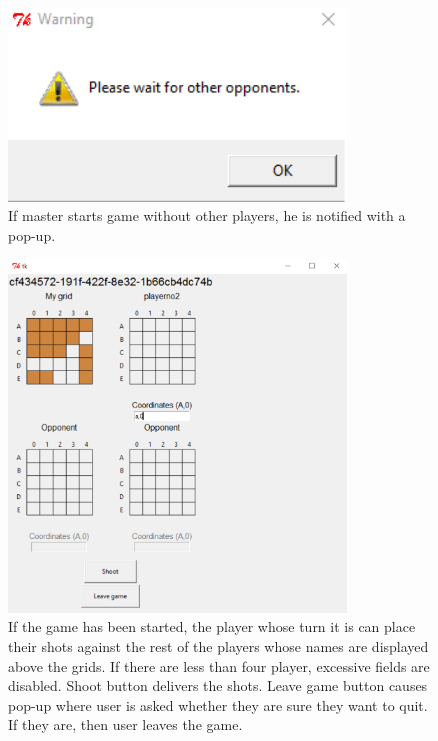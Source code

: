 \documentclass[]{article}
\begin{document}
\begin{figure}[!hbt]
	\centering
	\includegraphics[width=0.8\textwidth]{WaitPlayers.png}
	\caption{If master starts game without other players, he is notified with a pop-up.}
	\label{fig:Waitplayers}
\end{figure}

\begin{figure}[!hbt]
	\centering
	\includegraphics[width=0.8\textwidth]{GameOn.png}
	\caption{If the game has been started, the player whose turn it is can place their shots against the rest of the players whose names are displayed above the grids. If there are less than four player, excessive fields are disabled. Shoot button delivers the shots. Leave game button causes pop-up where user is asked whether they are sure they want to quit. If they are, then user leaves the game.}
	\label{fig:Gameon}
\end{figure}
\end{document}
